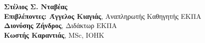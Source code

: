 \begin{center}
    \textbf{Στέλιος Σ. Νταβέας} \\
    \vspace{2.5cm}
    \textbf{Επιβλέποντες: Άγγελος Κιαγιάς}, Αναπληρωτής Καθηγητής ΕΚΠΑ\\
    \hspace{0.52cm}
    \textbf{Διονύσης Ζήνδρος}, Διδάκτωρ ΕΚΠΑ\\
    \hspace{-1.40cm}
    \textbf{Κωστής Καραντιάς}, MSc, IOHK

    \vspace{2.0cm}

    \date{\textbf{ΑΘΗΝΑ}, \\ \textbf{ΙΟΥΝΙΟΣ 2020}}
    \pagebreak
\end{center}
